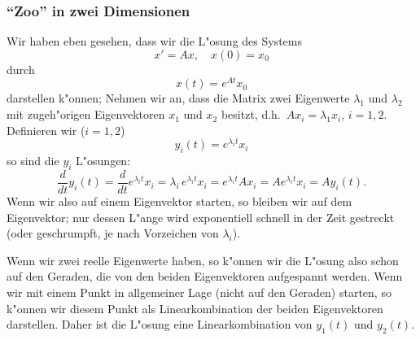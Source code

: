\subsubsection{``Zoo'' in zwei Dimensionen}
Wir haben eben gesehen, dass wir die L"osung des Systems
$$ x'=Ax, \quad x(0) = x_0$$
durch 
$$ x(t) = e^{A t} x_0$$
darstellen k"onnen; Nehmen wir an, dass die Matrix zwei Eigenwerte $\lambda_1$
und $\lambda_2$ mit zugeh"origen Eigenvektoren $x_1$ und $x_2$ besitzt, d.h.\ 
$A x_i = \lambda_1 x_i$, $i=1,2$. Definieren wir ($i=1,2$)
$$ y_i(t) = e^{\lambda_i t} x_i$$
so sind die $y_i$ L"osungen:
$$ \frac d {dt} y_i(t)
 = 
 \frac d {dt}e^{\lambda_i t} x_i
=
\lambda_i \, e^{\lambda_i t} x_i
= 
e^{\lambda_i t} Ax_i 
= 
A e^{\lambda_i t} x_i
= Ay_i(t).$$ 
Wenn wir also auf einem Eigenvektor starten, so bleiben wir auf dem Eigenvektor; nur dessen L"ange wird exponentiell schnell in der Zeit 
 gestreckt (oder geschrumpft, je nach Vorzeichen von $\lambda_i$). 
\par
Wenn wir zwei reelle Eigenwerte haben, so k"onnen wir die L"osung also schon 
auf den Geraden, die von den beiden Eigenvektoren aufgespannt werden. Wenn wir
mit einem Punkt in allgemeiner Lage (nicht auf den Geraden) starten, so k"onnen wir diesem Punkt als Linearkombination der beiden Eigenvektoren darstellen. 
Daher ist die L"osung eine Linearkombination von $y_1(t)$ und $y_2(t)$.\par
\medskip

